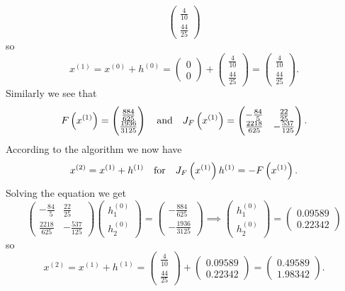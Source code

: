 \documentclass[11pt, a4paper]{article}
\begin{document}
\begin{solution}
\[\begin{pmatrix}
      \frac{4}{10} \\ \frac{44}{25}
    \end{pmatrix}
  \]
  so
  \[
    x^{(1)} = x^{(0)} + h^{(0)} =
    \begin{pmatrix}
      0 \\ 0
    \end{pmatrix} +
    \begin{pmatrix}
      \frac{4}{10} \\ \frac{44}{25}
    \end{pmatrix} =
    \begin{pmatrix}
      \frac{4}{10} \\ \frac{44}{25}
    \end{pmatrix}.
  \]
  Similarly we see that
  \[
    F\del{x^{(1)}} =
    \begin{pmatrix}
      \frac{884}{625} \\ \frac{1936}{3125}
    \end{pmatrix} \tand
    J_F\del{x^{(1)}} =
    \begin{pmatrix}
      -\frac{84}{5} & \frac{22}{25} \\
      \frac{2218}{625} & -\frac{537}{125}
    \end{pmatrix}.
  \]
  According to the algorithm we now have
  \[
    x^{(2)} = x^{(1)} + h^{(1)} \quad\text{for}\quad
    J_F\del{x^{(1)}} h^{(1)} = - F\del{x^{(1)}}.
  \]
  Solving the equation we get
  \[
    \begin{pmatrix}
      -\frac{84}{5} & \frac{22}{25} \\
      \frac{2218}{625} & -\frac{537}{125}
    \end{pmatrix}
    \begin{pmatrix}
      h^{(0)}_1 \\ h^{(0)}_2
    \end{pmatrix} =
    \begin{pmatrix}
      -\frac{884}{625} \\ -\frac{1936}{3125}
    \end{pmatrix} \implies
    \begin{pmatrix}
      h^{(0)}_1 \\ h^{(0)}_2
    \end{pmatrix} =
    \begin{pmatrix}
      0.09589 \\ 0.22342
    \end{pmatrix}
  \]
  so
  \[
    x^{(2)} = x^{(1)} + h^{(1)} =
    \begin{pmatrix}
      \frac{4}{10} \\ \frac{44}{25}
    \end{pmatrix} +
    \begin{pmatrix}
      0.09589 \\ 0.22342
    \end{pmatrix} =
    \begin{pmatrix}
      0.49589 \\ 1.98342
    \end{pmatrix}.
  \]
\end{solution}
\end{document}
